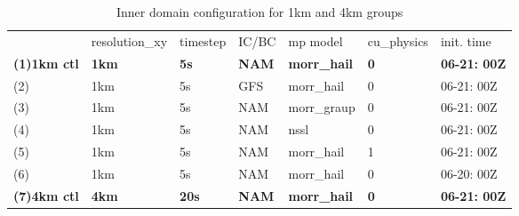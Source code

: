 \begin{table}[H]
\caption{Inner domain configuration for 1km and 4km groups}
\begin{tabular}{
>{\columncolor[HTML]{D4D4D4}}l llllll}
\cellcolor[HTML]{B0B3B2} & \cellcolor[HTML]{B0B3B2}resolution\_xy & \cellcolor[HTML]{B0B3B2}timestep & \cellcolor[HTML]{B0B3B2}IC/BC & \cellcolor[HTML]{B0B3B2}mp model   & \cellcolor[HTML]{B0B3B2}cu\_physics & \cellcolor[HTML]{B0B3B2}init. time \\
\textbf{(1)1km ctl}      & \textbf{1km}                           & \textbf{5s}                      & \textbf{NAM}                  & \textbf{morr\_hail}                & \textbf{0}                          & \textbf{06-21: 00Z}                \\
(2)                      & 1km                                    & 5s                               & {\color[HTML]{FE0000} GFS}    & morr\_hail                         & 0                                   & 06-21: 00Z                         \\
(3)                      & 1km                                    & 5s                               & NAM                           & {\color[HTML]{FE0000} morr\_graup} & 0                                   & 06-21: 00Z                         \\
(4)                      & 1km                                    & 5s                               & NAM                           & {\color[HTML]{FE0000} nssl}        & 0                                   & 06-21: 00Z                         \\
(5)                      & 1km                                    & 5s                               & NAM                           & morr\_hail                         & {\color[HTML]{FE0000} 1}            & 06-21: 00Z                         \\
(6)                      & 1km                                    & 5s                               & NAM                           & morr\_hail                         & 0                                   & {\color[HTML]{FE0000} 06-20: 00Z}  \\
\textbf{(7)4km ctl}      & \textbf{4km}                           & \textbf{20s}                     & \textbf{NAM}                  & \textbf{morr\_hail}                & \textbf{0}                          & \textbf{06-21: 00Z}                \\

\end{tabular}
\end{table}
